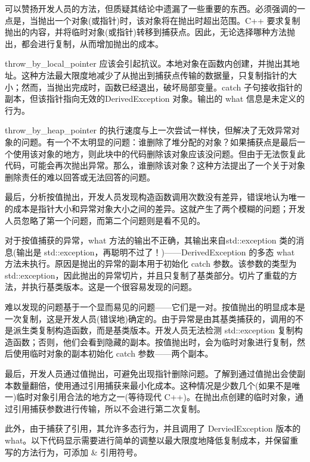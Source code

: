 
可以赞扬开发人员的方法，但质疑其结论中遗漏了一些重要的东西。必须强调的一点是，当抛出一个对象(或指针)时，该对象将在抛出时超出范围。C++ 要求复制抛出的内容，并将临时对象(或指针)转移到捕获点。因此，无论选择哪种方法抛出，都会进行复制，从而增加抛出的成本。

throw\_by\_local\_pointer 应该会引起抗议。本地对象在函数内创建，并抛出其地址。这种方法最大限度地减少了从抛出到捕获点传输的数据量，只复制指针的大小；然而，当抛出完成时，函数已经退出，破坏局部变量。catch 子句接收指针的副本，但该指针指向无效的DerivedException 对象。输出的 what 信息是未定义的行为。

throw\_by\_heap\_pointer 的执行速度与上一次尝试一样快，但解决了无效异常对象的问题。有一个不太明显的问题：谁删除了堆分配的对象？如果捕获点是最后一个使用该对象的地方，则此块中的代码删除该对象应该没问题。但由于无法恢复此代码，可能会再次抛出异常。那么，谁删除该对象？这种方法提出了一个关于对象删除责任的难以回答或无法回答的问题。

最后，分析按值抛出，开发人员发现构造函数调用次数没有差异，错误地认为唯一的成本是指针大小和异常对象大小之间的差异。这就产生了两个模糊的问题；开发人员忽略了第一个问题，而第二个问题则是看不见的。

对于按值捕获的异常，what 方法的输出不正确，其输出来自std::exception 类的消息(输出是 std::exception，再聪明不过了！)——DerivedException 的多态 what 方法未执行。原因是抛出的异常的副本用于初始化 catch 参数。该参数的类型为std::exception，因此抛出的异常切片，并且只复制了基类部分。切片了重载的方法，并执行基类版本。这是一个很容易发现的问题。

难以发现的问题基于一个显而易见的问题——它们是一对。按值抛出的明显成本是一次复制，这是开发人员(错误地)确定的。由于异常是由其基类捕获的，调用的不是派生类复制构造函数，而是基类版本。开发人员无法检测 std::exception 复制构造函数；否则，他们会看到隐藏的副本。按值抛出时，会为临时对象进行复制，然后使用临时对象的副本初始化 catch 参数——两个副本。


最后，开发人员通过值抛出，可避免出现指针删除问题。了解到通过值抛出会使副本数量翻倍，使用通过引用捕获来最小化成本。这种情况是少数几个(如果不是唯一)临时对象引用合法的地方之一(等待现代 C++)。在抛出点创建的临时对象，通过引用捕获参数进行传输，所以不会进行第二次复制。

此外，由于捕获了引用，其允许多态行为，并且调用了 DerviedException 版本的 what。以下代码显示需要进行简单的调整以最大限度地降低复制成本，并保留重写的方法行为，可添加 \& 引用符号。

